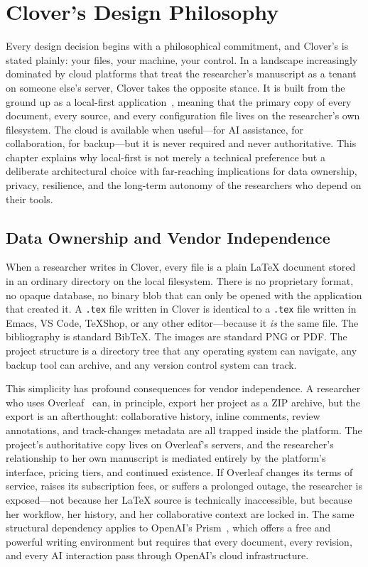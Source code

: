 \documentclass[a4paper,11pt]{article}
\begin{document}
\newpage

\section{Clover's Design Philosophy}
\label{sec:philosophy}

Every design decision begins with a philosophical commitment, and Clover's is stated plainly: your files, your machine, your control. In a landscape increasingly dominated by cloud platforms that treat the researcher's manuscript as a tenant on someone else's server, Clover takes the opposite stance. It is built from the ground up as a local-first application~\cite{Kleppmann2019LocalFirst}, meaning that the primary copy of every document, every source, and every configuration file lives on the researcher's own filesystem. The cloud is available when useful---for AI assistance, for collaboration, for backup---but it is never required and never authoritative. This chapter explains why local-first is not merely a technical preference but a deliberate architectural choice with far-reaching implications for data ownership, privacy, resilience, and the long-term autonomy of the researchers who depend on their tools.

\subsection{Data Ownership and Vendor Independence}

When a researcher writes in Clover, every file is a plain \LaTeX{} document stored in an ordinary directory on the local filesystem. There is no proprietary format, no opaque database, no binary blob that can only be opened with the application that created it. A \texttt{.tex} file written in Clover is identical to a \texttt{.tex} file written in Emacs, VS Code, TeXShop, or any other editor---because it \emph{is} the same file. The bibliography is standard BibTeX. The images are standard PNG or PDF. The project structure is a directory tree that any operating system can navigate, any backup tool can archive, and any version control system can track.

This simplicity has profound consequences for vendor independence. A researcher who uses Overleaf~\cite{Overleaf} can, in principle, export her project as a ZIP archive, but the export is an afterthought: collaborative history, inline comments, review annotations, and track-changes metadata are all trapped inside the platform. The project's authoritative copy lives on Overleaf's servers, and the researcher's relationship to her own manuscript is mediated entirely by the platform's interface, pricing tiers, and continued existence. If Overleaf changes its terms of service, raises its subscription fees, or suffers a prolonged outage, the researcher is exposed---not because her \LaTeX{} source is technically inaccessible, but because her workflow, her history, and her collaborative context are locked in. The same structural dependency applies to OpenAI's Prism~\cite{OpenAIPrism}, which offers a free and powerful writing environment but requires that every document, every revision, and every AI interaction pass through OpenAI's cloud infrastructure.
\end{document}
